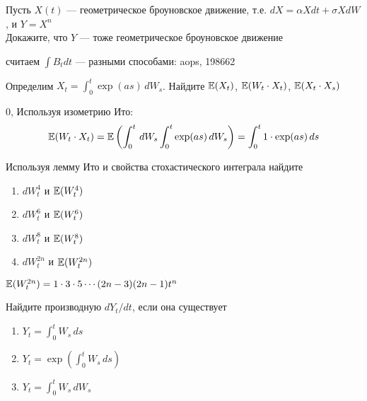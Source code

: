 \begin{problem}
Пусть $X(t)$ --- геометрическое броуновское движение, т.е. $dX=\alpha Xdt+\sigma XdW$, и $Y=X^{n}$ \\
Докажите, что $Y$ --- тоже геометрическое броуновское движение 
\end{problem} 
\begin{solution} 

\end{solution}

\begin{problem}
считаем $\int B_{t}dt$ --- разными способами: aops, 198662 
\end{problem} 
\begin{solution} 

\end{solution}

\begin{problem}
 Определим $X_t=\int_0^t \exp(as)\,dW_s$. Найдите $\mathbb{E}(X_t)$, $\mathbb{E}(W_t\cdot X_t)$, $\mathbb{E}(X_t\cdot X_s)$ 
\end{problem} 
\begin{solution} 
 $0$, Используя изометрию Ито:
\begin{equation}
\mathbb{E}(W_t\cdot X_t)=\mathbb{E}\left(\int_0^t\,dW_s \int_0^t\exp(as)\,dW_s\right)=\int_0^t 1\cdot \exp(as)\,ds
\end{equation}
\end{solution}

\begin{problem}
Используя лемму Ито и свойства стохастического интеграла найдите 
\begin{enumerate}
\item $dW^4_t$ и $\mathbb{E}(W^4_t)$
\item $dW^6_t$ и $\mathbb{E}(W^6_t)$
\item $dW^8_t$ и $\mathbb{E}(W^8_t)$
\item $dW^{2n}_t$ и $\mathbb{E}(W^{2n}_t)$
\end{enumerate} 
\end{problem} 
\begin{solution} 
 $\mathbb{E}(W^{2n}_t)=1\cdot 3\cdot 5 \cdots (2n-3)(2n-1)t^n$ 
\end{solution}

\begin{problem}
Найдите производную $dY_t/dt$, если она существует
\begin{enumerate}
\item $Y_t=\int_0^t W_s \, ds$
\item $Y_t=\exp (\int_0^t W_s \, ds)$
\item $Y_t=\int_0^t W_s \, dW_s$
\end{enumerate}
\end{problem}

